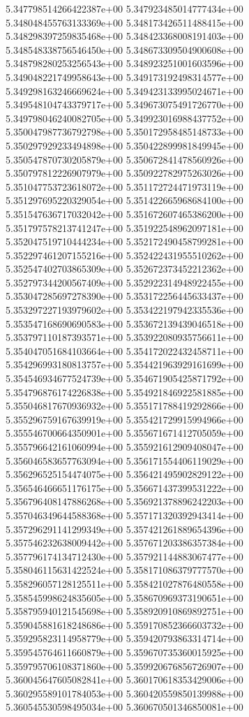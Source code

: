5.347798514266422387e+00
5.347923485014777434e+00
5.348048455763133369e+00
5.348173426511488415e+00
5.348298397259835468e+00
5.348423368008191403e+00
5.348548338756546450e+00
5.348673309504900608e+00
5.348798280253256543e+00
5.348923251001603596e+00
5.349048221749958643e+00
5.349173192498314577e+00
5.349298163246669624e+00
5.349423133995024671e+00
5.349548104743379717e+00
5.349673075491726770e+00
5.349798046240082705e+00
5.349923016988437752e+00
5.350047987736792798e+00
5.350172958485148733e+00
5.350297929233494898e+00
5.350422899981849945e+00
5.350547870730205879e+00
5.350672841478560926e+00
5.350797812226907979e+00
5.350922782975263026e+00
5.351047753723618072e+00
5.351172724471973119e+00
5.351297695220329054e+00
5.351422665968684100e+00
5.351547636717032042e+00
5.351672607465386200e+00
5.351797578213741247e+00
5.351922548962097181e+00
5.352047519710444234e+00
5.352172490458799281e+00
5.352297461207155216e+00
5.352422431955510262e+00
5.352547402703865309e+00
5.352672373452212362e+00
5.352797344200567409e+00
5.352922314948922455e+00
5.353047285697278390e+00
5.353172256445633437e+00
5.353297227193979602e+00
5.353422197942335536e+00
5.353547168690690583e+00
5.353672139439046518e+00
5.353797110187393571e+00
5.353922080935756611e+00
5.354047051684103664e+00
5.354172022432458711e+00
5.354296993180813757e+00
5.354421963929161699e+00
5.354546934677524739e+00
5.354671905425871792e+00
5.354796876174226838e+00
5.354921846922581885e+00
5.355046817670936932e+00
5.355171788419292866e+00
5.355296759167639919e+00
5.355421729915994966e+00
5.355546700664350901e+00
5.355671671412705059e+00
5.355796642161060994e+00
5.355921612909408047e+00
5.356046583657763094e+00
5.356171554406119029e+00
5.356296525154474075e+00
5.356421495902829122e+00
5.356546466651176175e+00
5.356671437399531222e+00
5.356796408147886268e+00
5.356921378896242203e+00
5.357046349644588368e+00
5.357171320392943414e+00
5.357296291141299349e+00
5.357421261889654396e+00
5.357546232638009442e+00
5.357671203386357384e+00
5.357796174134712430e+00
5.357921144883067477e+00
5.358046115631422524e+00
5.358171086379777570e+00
5.358296057128125511e+00
5.358421027876480558e+00
5.358545998624835605e+00
5.358670969373190651e+00
5.358795940121545698e+00
5.358920910869892751e+00
5.359045881618248686e+00
5.359170852366603732e+00
5.359295823114958779e+00
5.359420793863314714e+00
5.359545764611660879e+00
5.359670735360015925e+00
5.359795706108371860e+00
5.359920676856726907e+00
5.360045647605082841e+00
5.360170618353429006e+00
5.360295589101784053e+00
5.360420559850139988e+00
5.360545530598495034e+00
5.360670501346850081e+00
